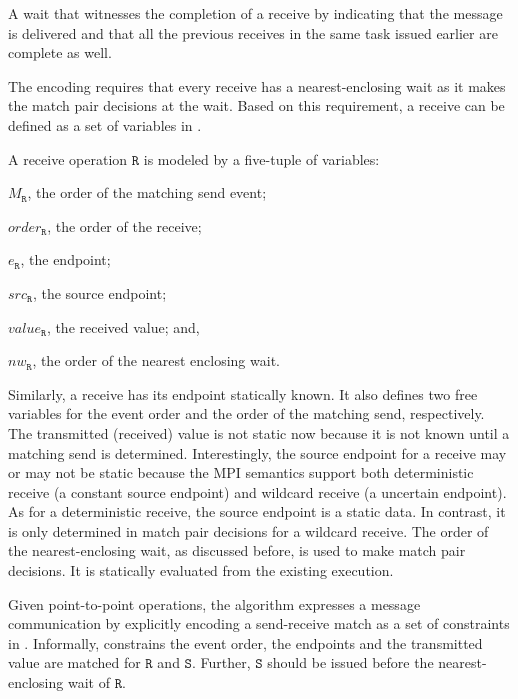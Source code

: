 \begin{definition} \label{def:nw}
A wait that witnesses the completion of a receive by indicating that
the message is delivered and that all the previous receives in the
same task issued earlier are complete as well.
\end{definition}

The encoding requires that every receive has a nearest-enclosing wait as it makes the match pair decisions at the wait. Based on this requirement, a receive can be defined as a set of variables in .

\begin{definition}[Receive] \label{def:rcv}
A receive operation $\mathtt{R}$ is modeled by a five-tuple of variables:
\begin{compactenum}
\item $M_\mathtt{R}$, the order of the matching send event;
\item $\mathit{order}_\mathtt{R}$, the order of the receive;
\item $e_\mathtt{R}$, the endpoint;
\item $src_\mathtt{R}$, the source endpoint;
\item $\mathit{value}_\mathtt{R}$, the received value; and,
\item $\mathit{nw}_\mathtt{R}$, the order of the nearest enclosing wait.
\end{compactenum}
\end{definition}

Similarly, a receive has its endpoint statically known. It also defines two free variables for the event order and the order of the matching send, respectively. The transmitted (received) value is not static now because it is not known until a matching send is determined. Interestingly, the source endpoint for a receive may or may not be static because the MPI semantics support both deterministic receive (a constant source endpoint) and wildcard receive (a uncertain endpoint). As for a deterministic receive, the source endpoint is a static data. In contrast, it is only determined in match pair decisions for a wildcard receive. The order of the nearest-enclosing wait, as discussed before, is used to make match pair decisions. It is statically evaluated from the existing execution.

Given point-to-point operations, the algorithm expresses a message communication by explicitly encoding a send-receive match as a set of constraints in . Informally,  constrains the event order, the endpoints and the transmitted value are matched for $\mathtt{R}$ and $\mathtt{S}$. Further, $\mathtt{S}$ should be issued before the nearest-enclosing wait of $\mathtt{R}$. 

